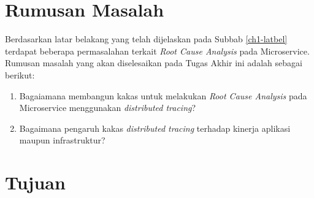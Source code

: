 %
%


\section{Rumusan Masalah}\label{RumusanMasalah}

Berdasarkan latar belakang yang telah dijelaskan pada Subbab \ref{ch1-latbel} terdapat beberapa permasalahan terkait \textit{Root Cause Analysis} pada Microservice. Rumusan masalah yang akan diselesaikan pada Tugas Akhir ini adalah sebagai berikut:
\begin{enumerate}
	\item Bagaiamana membangun kakas untuk melakukan \textit{Root Cause Analysis} pada Microservice menggunakan \textit{distributed tracing}?
	\item Bagaimana pengaruh kakas \textit{distributed tracing} terhadap kinerja aplikasi maupun infrastruktur?
\end{enumerate}

\section{Tujuan}

